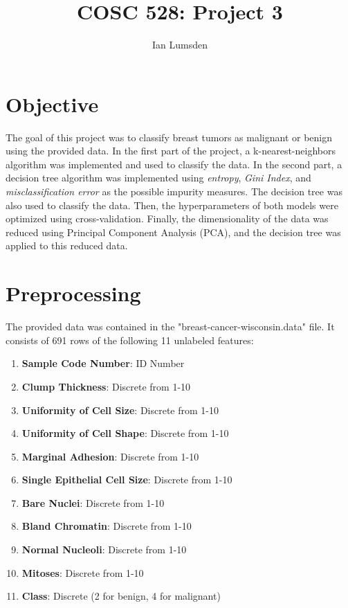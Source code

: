 \documentclass[12pt]{article}
\title{COSC 528: Project 3}
\author{Ian Lumsden}
\begin{document}
	\maketitle
	\newpage
	
	\section{Objective}
	The goal of this project was to classify breast tumors as malignant or benign using the provided data. In the first part of the project, a k-nearest-neighbors algorithm was implemented and used to classify the data. In the second part, a decision tree algorithm was implemented using \textit{entropy}, \textit{Gini Index}, and \textit{misclassification error} as the possible impurity measures. The decision tree was also used to classify the data. Then, the hyperparameters of both models were optimized using cross-validation. Finally, the dimensionality of the data was reduced using Principal Component Analysis (PCA), and the decision tree was applied to this reduced data. 
	
	\section{Preprocessing}
	The provided data was contained in the "breast-cancer-wisconsin.data" file. It consists of 691 rows of the following 11 unlabeled features:
	\begin{enumerate}
		\item \textbf{Sample Code Number}: ID Number
		\item \textbf{Clump Thickness}: Discrete from 1-10
		\item \textbf{Uniformity of Cell Size}: Discrete from 1-10
		\item \textbf{Uniformity of Cell Shape}:
		Discrete from 1-10
		\item \textbf{Marginal Adhesion}: Discrete from 1-10
		\item \textbf{Single Epithelial Cell Size}: Discrete from 1-10
		\item \textbf{Bare Nuclei}: Discrete from 1-10
		\item \textbf{Bland Chromatin}: Discrete from 1-10
		\item \textbf{Normal Nucleoli}: Discrete from 1-10
		\item \textbf{Mitoses}: Discrete from 1-10
		\item \textbf{Class}: Discrete (2 for benign, 4 for malignant)
	\end{enumerate}
\end{document}
